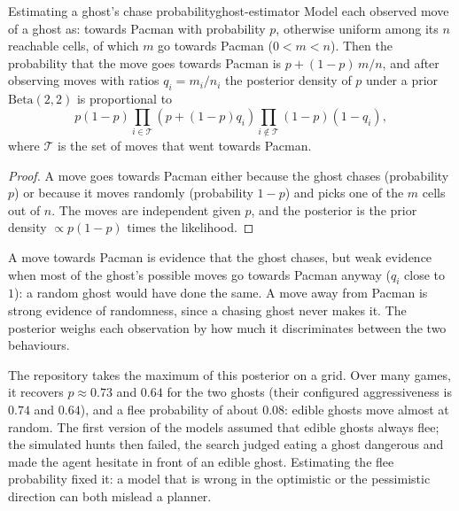 \begin{proposition}{Estimating a ghost's chase probability}{ghost-estimator}
  Model each observed move of a ghost as: towards Pacman with probability
  $p$, otherwise uniform among its $n$ reachable cells, of which $m$ go
  towards Pacman ($0 < m < n$). Then the probability that the move goes
  towards Pacman is $p + (1 - p)\, m / n$, and after observing moves with
  ratios $q_i = m_i / n_i$ the posterior density of $p$ under a prior
  $\mathrm{Beta}(2, 2)$ is proportional to
  \begin{equation}
    p (1 - p) \prod_{i \in \mathcal{T}} \left( p + (1 - p) q_i \right)
    \prod_{i \notin \mathcal{T}} (1 - p)(1 - q_i),
  \end{equation}
  where $\mathcal{T}$ is the set of moves that went towards Pacman.
\end{proposition}

\begin{proof}
  A move goes towards Pacman either because the ghost chases (probability
  $p$) or because it moves randomly (probability $1 - p$) and picks one of
  the $m$ cells out of $n$. The moves are independent given $p$, and the
  posterior is the prior density $\propto p(1 - p)$ times the likelihood.
\end{proof}

\begin{intuition}
  A move towards Pacman is evidence that the ghost chases, but weak
  evidence when most of the ghost's possible moves go towards Pacman anyway
  ($q_i$ close to $1$): a random ghost would have done the same. A move
  away from Pacman is strong evidence of randomness, since a chasing ghost
  never makes it. The posterior weighs each observation by how much it
  discriminates between the two behaviours.
\end{intuition}

The repository takes the maximum of this posterior on a grid. Over many
games, it recovers $p \approx 0.73$ and $0.64$ for the two ghosts (their
configured aggressiveness is $0.74$ and $0.64$), and a flee probability of
about $0.08$: edible ghosts move almost at random. The first version of
the models assumed that edible ghosts always flee; the simulated hunts then
failed, the search judged eating a ghost dangerous and made the agent
hesitate in front of an edible ghost. Estimating the flee probability
fixed it: a model that is wrong in the optimistic or the pessimistic
direction can both mislead a planner.


